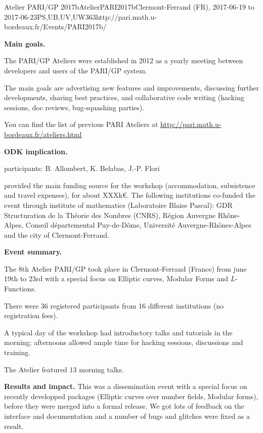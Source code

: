 \begin{event}{Atelier PARI/GP 2017b}{AtelierPARI2017b}{Clermont-Ferrand (FR),
2017-06-19 to 2017-06-23}{PS,UB,UV,UW}{36}{3}{http://pari.math.u-bordeaux.fr/Events/PARI2017b/}

\textbf{Main goals.}

The PARI/GP Ateliers were established in 2012 as a yearly meeting
between developers and users of the PARI/GP system.

The main goals are advertising new features and improvements,
discussing further developments, sharing best practices, and collaborative
code writing (hacking sessions, doc reviews, bug-squashing parties).

You can find the list of previous PARI Ateliers at
\url{http://pari.math.u-bordeaux.fr/ateliers.html}

\textbf{ODK implication.} 

\ODK participants: B. Allombert, K. Belabas, J.-P. Flori

\ODK provided the main funding source for the workshop (accommodation,
subsistence and travel expenses), for about XXXk\euro. The following
institutions co-funded the event through institute of mathematics (Laboratoire
  Blaise Pascal): GDR Structuration de la Théorie des Nombres (CNRS), Région
  Auvergne Rhône-Alpes, Conseil départemental Puy-de-Dôme, Université
  Auvergne-Rhônes-Alpes and the city of Clermont-Ferrand.

\textbf{Event summary.} 

The 8th Atelier PARI/GP took place in Clermont-Ferrand (France) from june
19th to 23rd with a special focus on Elliptic curves, Modular Forms and
$L$-Functions.

There were 36 registered participants from 16 different institutions
(no registration fees).

A typical day of the workshop had introductory talks and tutorials
in the morning; afternoons allowed ample time for hacking sessions,
discussions and training.

The Atelier featured 13 morning talks.

\textbf{Results and impact.} 
This was a dissemination event with a special focus on recently developped
packages (Elliptic curves over number fields, Modular forms), before they were
merged into a formal release. We got lots of feedback on the interface and
documentation and a number of bugs and glitches were fixed as a result.
\end{event}
